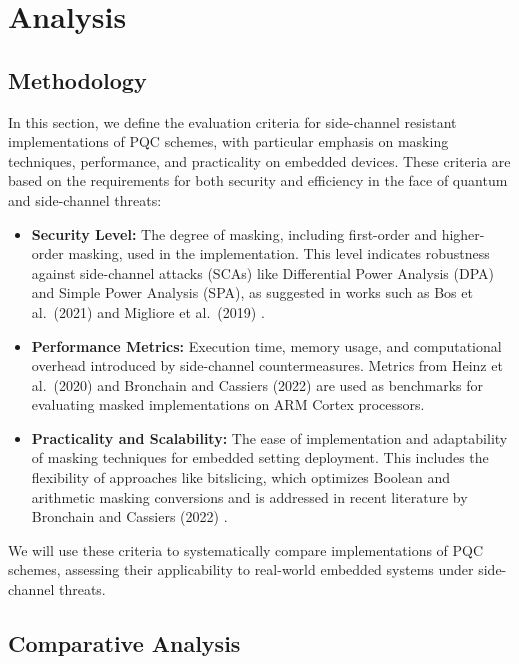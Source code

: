 \chapter{Analysis}

\section{Methodology}

In this section, we define the evaluation criteria for side-channel resistant implementations of \ac{PQC} schemes, with particular emphasis on masking techniques, performance, and practicality on embedded devices. These criteria are based on the requirements for both security and efficiency in the face of quantum and side-channel threats:

\begin{itemize}
    \item \textbf{Security Level:} The degree of masking, including first-order and higher-order masking, used in the implementation. This level indicates robustness against side-channel attacks (\acp{SCA}) like Differential Power Analysis (\ac{DPA}) and Simple Power Analysis (\ac{SPA}), as suggested in works such as Bos et al.\ (2021) \cite{Bos21} and Migliore et al.\ (2019) \cite{Migliore19}.
    \item \textbf{Performance Metrics:} Execution time, memory usage, and computational overhead introduced by side-channel countermeasures. Metrics from Heinz et al.\ (2020) \cite{Heinz20} and Bronchain and Cassiers (2022) \cite{Bronchain22} are used as benchmarks for evaluating masked implementations on \ac{ARM} Cortex processors.
    \item \textbf{Practicality and Scalability:} The ease of implementation and adaptability of masking techniques for embedded setting deployment. This includes the flexibility of approaches like bitslicing, which optimizes Boolean and arithmetic masking conversions and is addressed in recent literature by Bronchain and Cassiers (2022) \cite{Bronchain22}.
\end{itemize}

We will use these criteria to systematically compare implementations of \ac{PQC} schemes, assessing their applicability to real-world embedded systems under side-channel threats.

\section{Comparative Analysis}

